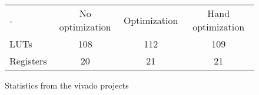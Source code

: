 \begin{figure}
	\centering
	\begin{tabular}{ l c c c }
		 -        & No optimization & Optimization & Hand optimization \\
		LUTs      & 108             & 112          & 109\\
		Registers & 20              & 21           & 21\\
	\end{tabular}
	\caption{Statistics from the vivado projects}
\label{table:vhdl_improvements_vivado}
\end{figure}